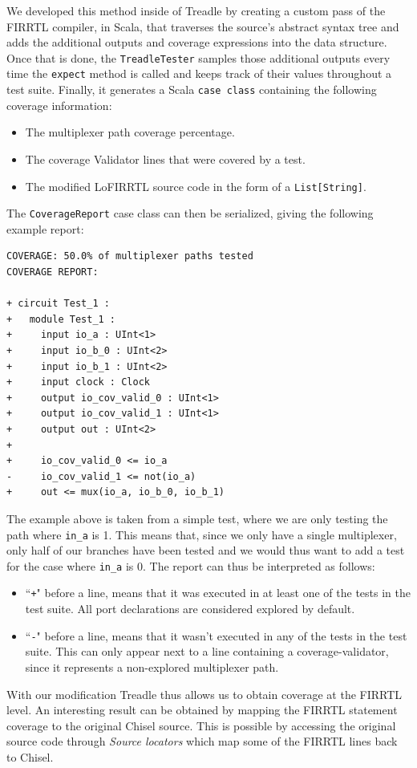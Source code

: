 \documentclass[runningheads]{llncs}
\begin{document}
We developed this method inside of Treadle by creating a custom pass of the FIRRTL compiler, in Scala, that traverses the source's abstract syntax tree and adds the additional outputs and coverage expressions into the data structure. Once that is done, the \texttt{TreadleTester} samples those additional outputs every time the \texttt{expect} method is called and keeps track of their values throughout a test suite. Finally, it generates a Scala \texttt{case class} containing the following coverage information:
\begin{itemize}
\item The multiplexer path coverage percentage.
\item The coverage Validator lines that were covered by a test.
\item The modified LoFIRRTL source code in the form of a \texttt{List[String]}.
\end{itemize}
The \texttt{CoverageReport} case class can then be serialized, giving the following example report:
\begin{verbatim}
COVERAGE: 50.0% of multiplexer paths tested
COVERAGE REPORT:

+ circuit Test_1 :
+   module Test_1 :
+     input io_a : UInt<1>
+     input io_b_0 : UInt<2>
+     input io_b_1 : UInt<2>
+     input clock : Clock
+     output io_cov_valid_0 : UInt<1>
+     output io_cov_valid_1 : UInt<1>
+     output out : UInt<2>
+   
+     io_cov_valid_0 <= io_a
-     io_cov_valid_1 <= not(io_a)
+     out <= mux(io_a, io_b_0, io_b_1)
\end{verbatim}
The example above is taken from a simple test, where we are only testing the path where \texttt{in\_a} is 1. This means that, since we only have a single multiplexer, only half of our branches have been tested and we would thus want to add a test for the case where \texttt{in\_a} is 0. The report can thus be interpreted as follows:  
\begin{itemize}
\item ``\texttt{+}" before a line, means that it was executed in at least one of the tests in the test suite. All port declarations are considered explored by default.
\item ``\texttt{-}" before a line, means that it wasn't executed in any of the tests in the test suite. This can only appear next to a line containing a coverage-validator, since it represents a non-explored multiplexer path.
\end{itemize}

With our modification Treadle thus allows us to obtain coverage at the FIRRTL level. An interesting result can be obtained by mapping the FIRRTL statement coverage to the original Chisel source. This is possible by accessing the original source code through \textit{Source locators} which map some of the FIRRTL lines back to Chisel.
\end{document}
